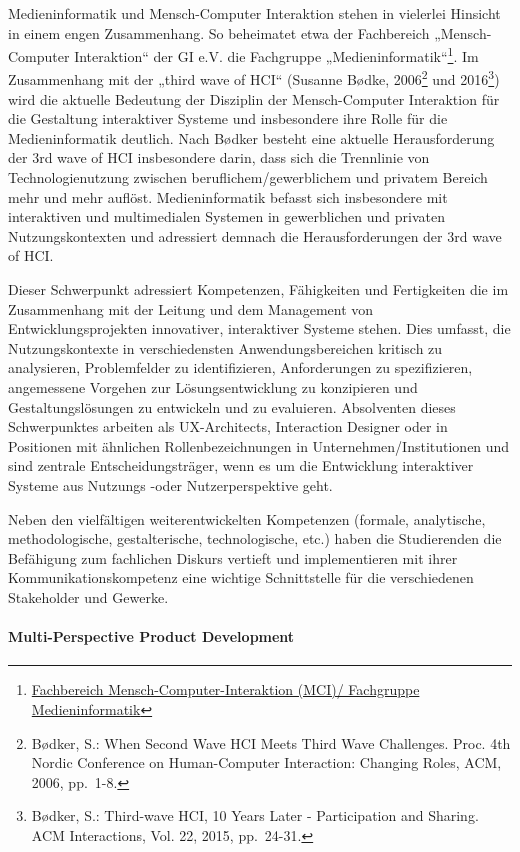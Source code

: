 Medieninformatik und Mensch-Computer Interaktion stehen in vielerlei
Hinsicht in einem engen Zusammenhang. So beheimatet etwa der Fachbereich
„Mensch-Computer Interaktion`` der GI e.V. die Fachgruppe
„Medieninformatik``\footnote{\href{http://fb-mci.gi.de/mensch-computer-interaktion-mci/fachgruppen/medieninformatik.html}{Fachbereich
  Mensch-Computer-Interaktion (MCI)/ Fachgruppe Medieninformatik}}. Im
Zusammenhang mit der „third wave of HCI`` (Susanne Bødke, 2006\footnote{Bødker,
  S.: When Second Wave HCI Meets Third Wave Challenges. Proc. 4th Nordic
  Conference on Human-Computer Interaction: Changing Roles, ACM, 2006,
  pp.~1-8.} und 2016\footnote{Bødker, S.: Third-wave HCI, 10 Years Later
  - Participation and Sharing. ACM Interactions, Vol. 22, 2015,
  pp.~24-31.}) wird die aktuelle Bedeutung der Disziplin der
Mensch-Computer Interaktion für die Gestaltung interaktiver Systeme und
insbesondere ihre Rolle für die Medieninformatik deutlich. Nach Bødker
besteht eine aktuelle Herausforderung der 3rd wave of HCI insbesondere
darin, dass sich die Trennlinie von Technologienutzung zwischen
beruflichem/gewerblichem und privatem Bereich mehr und mehr auflöst.
Medieninformatik befasst sich insbesondere mit interaktiven und
multimedialen Systemen in gewerblichen und privaten Nutzungskontexten
und adressiert demnach die Herausforderungen der 3rd wave of HCI.

Dieser Schwerpunkt adressiert Kompetenzen, Fähigkeiten und Fertigkeiten
die im Zusammenhang mit der Leitung und dem Management von
Entwicklungsprojekten innovativer, interaktiver Systeme stehen. Dies
umfasst, die Nutzungskontexte in verschiedensten Anwendungsbereichen
kritisch zu analysieren, Problemfelder zu identifizieren, Anforderungen
zu spezifizieren, angemessene Vorgehen zur Lösungsentwicklung zu
konzipieren und Gestaltungslösungen zu entwickeln und zu evaluieren.
Absolventen dieses Schwerpunktes arbeiten als UX-Architects, Interaction
Designer oder in Positionen mit ähnlichen Rollenbezeichnungen in
Unternehmen/Institutionen und sind zentrale Entscheidungsträger, wenn es
um die Entwicklung interaktiver Systeme aus Nutzungs -oder
Nutzerperspektive geht.

Neben den vielfältigen weiterentwickelten Kompetenzen (formale,
analytische, methodologische, gestalterische, technologische, etc.)
haben die Studierenden die Befähigung zum fachlichen Diskurs vertieft
und implementieren mit ihrer Kommunikationskompetenz eine wichtige
Schnittstelle für die verschiedenen Stakeholder und Gewerke.

\paragraph{Multi-Perspective Product
Development\label{/mi-2017/selbstbericht/0400-studiengangskonzept/0000-studiengangskonzept}}\label{multi-perspective-product-developmentpathlabelmi-2017selbstbericht0400-studiengangskonzept0000-studiengangskonzept}

